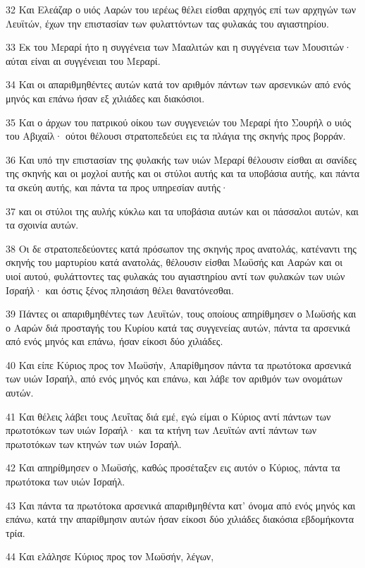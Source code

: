 \par 32 Και Ελεάζαρ ο υιός Ααρών του ιερέως θέλει είσθαι αρχηγός επί των αρχηγών των Λευϊτών, έχων την επιστασίαν των φυλαττόντων τας φυλακάς του αγιαστηρίου.
\par 33 Εκ του Μεραρί ήτο η συγγένεια των Μααλιτών και η συγγένεια των Μουσιτών· αύται είναι αι συγγένειαι του Μεραρί.
\par 34 Και οι απαριθμηθέντες αυτών κατά τον αριθμόν πάντων των αρσενικών από ενός μηνός και επάνω ήσαν εξ χιλιάδες και διακόσιοι.
\par 35 Και ο άρχων του πατρικού οίκου των συγγενειών του Μεραρί ήτο Σουρήλ ο υιός του Αβιχαίλ· ούτοι θέλουσι στρατοπεδεύει εις τα πλάγια της σκηνής προς βορράν.
\par 36 Και υπό την επιστασίαν της φυλακής των υιών Μεραρί θέλουσιν είσθαι αι σανίδες της σκηνής και οι μοχλοί αυτής και οι στύλοι αυτής και τα υποβάσια αυτής, και πάντα τα σκεύη αυτής, και πάντα τα προς υπηρεσίαν αυτής·
\par 37 και οι στύλοι της αυλής κύκλω και τα υποβάσια αυτών και οι πάσσαλοι αυτών, και τα σχοινία αυτών.
\par 38 Οι δε στρατοπεδεύοντες κατά πρόσωπον της σκηνής προς ανατολάς, κατέναντι της σκηνής του μαρτυρίου κατά ανατολάς, θέλουσιν είσθαι Μωϋσής και Ααρών και οι υιοί αυτού, φυλάττοντες τας φυλακάς του αγιαστηρίου αντί των φυλακών των υιών Ισραήλ· και όστις ξένος πλησιάση θέλει θανατόνεσθαι.
\par 39 Πάντες οι απαριθμηθέντες των Λευϊτών, τους οποίους απηρίθμησεν ο Μωϋσής και ο Ααρών διά προσταγής του Κυρίου κατά τας συγγενείας αυτών, πάντα τα αρσενικά από ενός μηνός και επάνω, ήσαν είκοσι δύο χιλιάδες.
\par 40 Και είπε Κύριος προς τον Μωϋσήν, Απαρίθμησον πάντα τα πρωτότοκα αρσενικά των υιών Ισραήλ, από ενός μηνός και επάνω, και λάβε τον αριθμόν των ονομάτων αυτών.
\par 41 Και θέλεις λάβει τους Λευΐτας διά εμέ, εγώ είμαι ο Κύριος αντί πάντων των πρωτοτόκων των υιών Ισραήλ· και τα κτήνη των Λευϊτών αντί πάντων των πρωτοτόκων των κτηνών των υιών Ισραήλ.
\par 42 Και απηρίθμησεν ο Μωϋσής, καθώς προσέταξεν εις αυτόν ο Κύριος, πάντα τα πρωτότοκα των υιών Ισραήλ.
\par 43 Και πάντα τα πρωτότοκα αρσενικά απαριθμηθέντα κατ' όνομα από ενός μηνός και επάνω, κατά την απαρίθμησιν αυτών ήσαν είκοσι δύο χιλιάδες διακόσια εβδομήκοντα τρία.
\par 44 Και ελάλησε Κύριος προς τον Μωϋσήν, λέγων,
